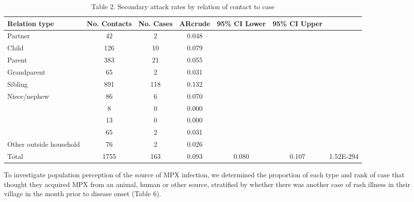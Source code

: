 \begin{table}[!hb]
    \begin{tabular}{@{}lccccc@{}}
    \toprule
    Relation type & No. Contacts & No. Cases & ARcrude & 95\% CI Lower & 95\% CI Upper  \\
    \cmidrule
    Partner & 42 & 2 & 0.048 & ~  & ~ & ~ \\ 
    Child & 126 & 10 & 0.079 & ~  & ~ & ~ \\                  
    Parent & 383 & 21 & 0.055 & ~  & ~  & ~ \\
    Grandparent & 65       & 2     & 0.031 & ~  & ~  & ~ \\
    Sibling & 891      & 118   & 0.132  & ~  & ~  & ~ \\
    Niece/nephew & 86       & 6     & 0.070  & ~  & ~  & ~ \\
    ~   & 8        & 0     & 0.000 & ~  & ~  & ~ \\
    ~   & 13       & 0     & 0.000  & ~  & ~  & ~ \\
    ~   & 65       & 2     & 0.031   & ~  & ~  & ~ \\
    Other outside household & 76 & 2 & 0.026 & ~  & ~  & ~ \\
    Total & 1755 & 163 & 0.093 & 0.080 & 0.107 & 1.52E-294 \\
    \bottomrule
    \end{tabular}
    \caption{Table 2. Secondary attack rates by relation of contact to case}
    \label{table2}
\end{table}


To investigate population perception of the source of MPX infection, we determined the proportion of each type and rank of case that thought they acquired MPX from an animal, human or other source, stratified by whether there was another case of rash illness in their village in the month prior to disease onset (Table 6). 
